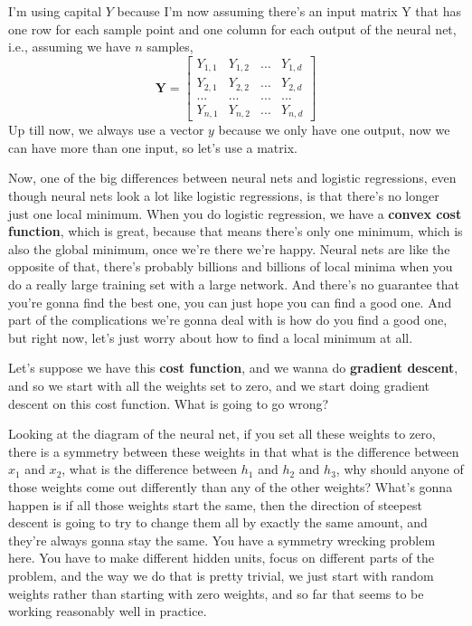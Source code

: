 \documentclass[fleqn,10pt]{olplainarticle}
\theoremstyle{definition}
\theoremstyle{remark}
\begin{document}
I'm using capital $Y$ because I'm now assuming there's an input matrix Y that has one row for each sample point and one column for each output of the neural net, i.e., assuming we have $n$ samples, 
$$
\mathbf{Y} = 
\begin{bmatrix} 
Y_{1,1} & Y_{1,2} & ... & Y_{1,d} \\
Y_{2,1} & Y_{2,2} & ... & Y_{2,d} \\
... & ... & ... & ... \\
Y_{n,1} & Y_{n,2} & ... & Y_{n,d}
\end{bmatrix}
$$
Up till now, we always use a vector $y$ because we only have one output, now we can have more than one input, so let's use a matrix. 

Now, one of the big differences between neural nets and logistic regressions, even though neural nets look a lot like logistic regressions, is that there's no longer just one local minimum. When you do logistic regression, we have a \textbf{convex cost function}, which is great, because that means there's only one minimum, which is also the global minimum, once we're there we're happy. Neural nets are like the opposite of that, there's probably billions and billions of local minima when you do a really large training set with a large network. And there's no guarantee that you're gonna find the best one, you can just hope you can find a good one. And part of the complications we're gonna deal with is how do you find a good one, but right now, let's just worry about how to find a local minimum at all. 

Let's suppose we have this \textbf{cost function}, and we wanna do \textbf{gradient descent}, and so we start with all the weights set to zero, and we start doing gradient descent on this cost function. What is going to go wrong?

Looking at the diagram of the neural net, if you set all these weights to zero, there is a symmetry between these weights in that what is the difference between $x_1$ and $x_2$, what is the difference between $h_1$ and $h_2$ and $h_3$, why should anyone of those weights come out differently than any of the other weights? What's gonna happen is if all those weights start the same, then the direction of steepest descent is going to try to change them all by exactly the same amount, and they're always gonna stay the same. You have a symmetry wrecking problem here. You have to make different hidden units, focus on different parts of the problem, and the way we do that is pretty trivial, we just start with random weights rather than starting with zero weights, and so far that seems to be working reasonably well in practice. 
\end{document}
